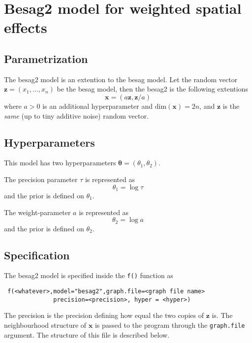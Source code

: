 \documentclass[a4paper,11pt]{article}
\begin{document}
\section*{Besag2 model for weighted spatial effects}

\subsection*{Parametrization}

The besag2 model is an extention to the besag model. Let the random
vector $\mathbf{z}=(x_1,\dots,x_n)$ be the besag model, then the
besag2 is the following extentions
\begin{displaymath}
    \mathbf{x} = (a\mathbf{z}, \mathbf{z}/a)
\end{displaymath}
where $a>0$ is an additional hyperparameter and
$\text{dim}(\mathbf{x}) = 2n$, and $\mathbf{z}$ is the \emph{same} (up
to tiny additive noise) random vector.

\subsection*{Hyperparameters}

This model has two hyperparameters $\mathbf{\theta} = (\theta_{1},
\theta_{2})$.

The precision parameter $\tau$ is represented as
\begin{displaymath}
    \theta_{1} =\log \tau
\end{displaymath}
and the prior is defined on $\theta_{1}$.

The weight-parameter $a$ is represented as
\begin{displaymath}
    \theta_{2} = \log a
\end{displaymath}
and the prior is defined on $\theta_{2}$.

\subsection*{Specification}

The besag2 model is specified inside the {\tt f()} function as
\begin{verbatim}
 f(<whatever>,model="besag2",graph.file=<graph file name>
              precision=<precision>, hyper = <hyper>)
\end{verbatim}

The precision is the precision defining how equal the two copies of
$\mathbf{z}$ is. The neighbourhood structure of $\mathbf{x}$ is passed
to the program through the {\tt graph.file} argument.  The structure
of this file is described below.
\end{document}
